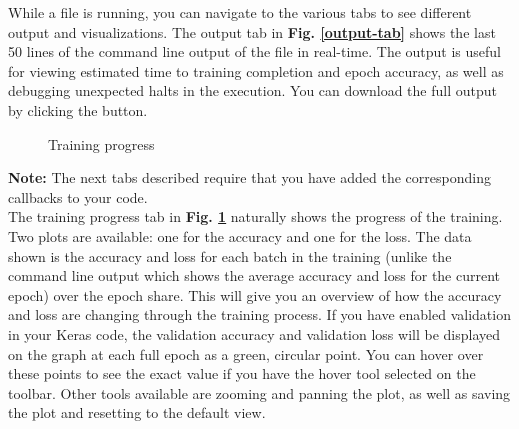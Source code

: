 \noindent While a file is running, you can navigate to the various tabs to see different output and visualizations. The output tab in \textbf{Fig. \ref{output-tab}} shows the last 50 lines of the command line output of the file in real-time. The output is useful for viewing estimated time to training completion and epoch accuracy, as well as debugging unexpected halts in the execution. You can download the full output by clicking the button. \\


\begin{figure}[h!]
    \centering
        \caption{Training progress}
        \label{trainingprog-tab}
\end{figure}

\noindent \textbf{Note: }The next tabs described require that you have added the corresponding callbacks to your code. \\

\noindent The training progress tab in \textbf{Fig. \ref{trainingprog-tab}} naturally shows the progress of the training. Two plots are available: one for the accuracy and one for the loss. The data shown is the accuracy and loss for each batch in the training (unlike the command line output which shows the average accuracy and loss for the current epoch) over the epoch share. This will give you an overview of how the accuracy and loss are changing through the training process. If you have enabled validation in your Keras code, the validation accuracy and validation loss will be displayed on the graph at each full epoch as a green, circular point. You can hover over these points to see the exact value if you have the hover tool selected on the toolbar. Other tools available are zooming and panning the plot, as well as saving the plot and resetting to the default view. \\

